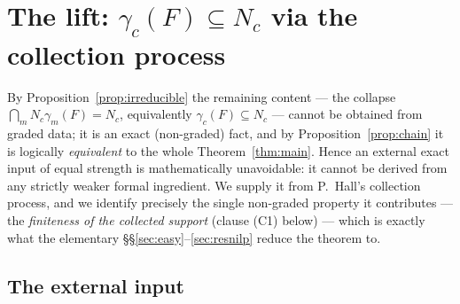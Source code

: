 \documentclass{amsart}
\theoremstyle{definition}
\theoremstyle{remark}
\begin{document}
\section{The lift: $\gamma_c(F)\subseteq N_c$ via the collection process}\label{sec:lift}

By Proposition~\ref{prop:irreducible} the remaining content --- the collapse
$\bigcap_m N_c\gamma_m(F)=N_c$, equivalently $\gamma_c(F)\subseteq N_c$ --- cannot be
obtained from graded data; it is an exact (non-graded) fact, and by
Proposition~\ref{prop:chain} it is logically \emph{equivalent} to the whole
Theorem~\ref{thm:main}. Hence an external exact input of equal strength is
mathematically unavoidable: it cannot be derived from any strictly weaker formal
ingredient. We supply it from P.~Hall's collection process, and we identify precisely
the single non-graded property it contributes --- the \emph{finiteness of the collected
support} (clause (C1) below) --- which is exactly what the elementary
\S\S\ref{sec:easy}--\ref{sec:resnilp} reduce the theorem to.

\subsection*{The external input}
\end{document}
